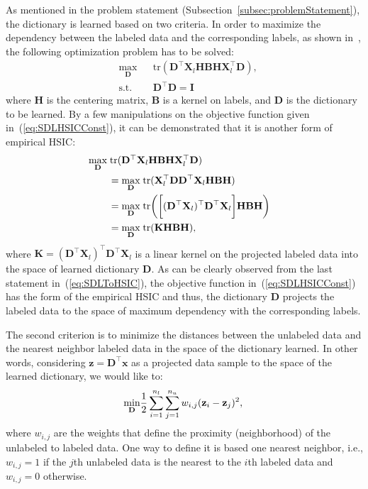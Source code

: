 \documentclass{llncs}
\begin{document}
As mentioned in the problem statement (Subsection~\ref{subsec:problemStatement}), the dictionary is learned based on two criteria. In order to maximize the dependency between the labeled data and the corresponding labels, as shown in~\cite{Gangeh:TSP13}, the following optimization problem has to be solved:
\begin{equation}\label{eq:SDLHSICConst}
\begin{aligned}
& \underset{\mathbf{D}}{\text{max}}
& & \text{tr}(\mathbf{D}^{\top}\mathbf{X}_l\mathbf{HBH}\mathbf{X}_l^{\top}\mathbf{D}), \\
& \text{s.t.}
& & \mathbf{D}^{\top}\mathbf{D}=\mathbf{I}
\end{aligned}
\end{equation}
where $\mathbf{H}$ is the centering matrix, $\mathbf{B}$ is a kernel on labels, and $\mathbf{D}$ is the dictionary to be learned.
By a few manipulations on the objective function given in~(\ref{eq:SDLHSICConst}), it can be demonstrated that it is another form of empirical HSIC:
\begin{align}\label{eq:SDLToHSIC}    %
  \makebox[2em][l]{$\underset{\mathbf{D}}{\text{max}}\; \text{tr}(\mathbf{D}^{\top}\mathbf{X}_l\mathbf{HBH}\mathbf{X}_l^{\top}\mathbf{D})$}  \nonumber \\
  &=\underset{\mathbf{D}}{\text{max}}\; \text{tr}(\mathbf{X}_l^{\top}\mathbf{D}\mathbf{D}^{\top}\mathbf{X}_l\mathbf{HBH}) \nonumber \\
  &=\underset{\mathbf{D}}{\text{max}}\; \text{tr}\bigg(\bigg[(\mathbf{D}^{\top}\mathbf{X}_l)^{\top}\mathbf{D}^{\top}\mathbf{X}_l\bigg]\mathbf{HBH}\bigg) \nonumber \\
  &=\underset{\mathbf{D}}{\text{max}}\; \text{tr}(\mathbf{KHBH}),
\end{align}
where $\mathbf{K}=(\mathbf{D}^{\top}\mathbf{X}_l)^{\top}\mathbf{D}^{\top}\mathbf{X}_l$ is a linear kernel on the projected labeled data into the space of learned dictionary $\mathbf{D}$. As can be clearly observed from the last statement in~(\ref{eq:SDLToHSIC}), the objective function in~(\ref{eq:SDLHSICConst}) has the form of the empirical HSIC and thus, the dictionary $\mathbf{D}$ projects the labeled data to the space of maximum dependency with the corresponding labels.

The second criterion is to minimize the distances between the unlabeled data and the nearest neighbor labeled data in the space of the dictionary learned. In other words, considering $\mathbf{z}=\mathbf{D}^{\top}\mathbf{x}$ as a projected data sample to the space of the learned dictionary, we would like to:
\begin{equation}\label{eq:proximity}
\underset{\mathbf{D}}{\text{min}}
\frac{1}{2}\sum_{i=1}^{n_l}\sum_{j=1}^{n_u}w_{i,j}(\mathbf{z}_i - \mathbf{z}_j)^2, \\
\end{equation}
where $w_{i,j}$ are the weights that define the proximity (neighborhood) of the unlabeled to labeled data. One way to define it is based one nearest neighbor, i.e., $w_{i,j}=1$ if the $j$th unlabeled data is the nearest to the $i$th labeled data and $w_{i,j}=0$ otherwise.
\end{document}
